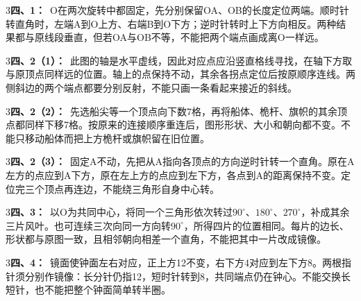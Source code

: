 \documentclass[multi=snippet,border={5bp 20bp 5bp 5bp}]{standalone}
\newenvironment{snippet}[3]{\begin{minipage}{#1bp}\color{answerred}\fontsize{#2}{#3}\selectfont\raggedright}{\end{minipage}}
\begin{document}
\begin{snippet}{505}{11.5}{14}\begin{multicols}{3}\raggedcolumns \textbf{四、1：}\ O在两次旋转中都固定，先分别保留OA、OB的长度定位两端。顺时针转直角时，左端A到O上方、右端B到O下方；逆时针转时上下方向相反。两种结果都与原线段垂直，但若OA与OB不等，不能把两个端点画成离O一样远。\end{multicols}\end{snippet}
\begin{snippet}{505}{11.5}{14}\begin{multicols}{3}\raggedcolumns \textbf{四、2（1）：}\ 此图的轴是水平虚线，因此对应点应沿竖直格线寻找，在轴下方取与原顶点同样远的位置。轴上的点保持不动，其余各拐点定位后按原顺序连线。两侧斜边的两个端点都要分别反射，不能只画一条看起来接近的斜线。\end{multicols}\end{snippet}
\begin{snippet}{505}{11.5}{14}\begin{multicols}{3}\raggedcolumns \textbf{四、2（2）：}\ 先选船尖等一个顶点向下数7格，再将船体、桅杆、旗帜的其余顶点都同样下移7格。按原来的连接顺序重连后，图形形状、大小和朝向都不变。不能只移动船体而把上方桅杆或旗帜留在旧位置。\end{multicols}\end{snippet}
\begin{snippet}{505}{11.5}{14}\begin{multicols}{3}\raggedcolumns \textbf{四、2（3）：}\ 固定A不动，先把从A指向各顶点的方向逆时针转一个直角。原在A左方的点应到A下方，原在左上方的点应到左下方，各点到A的距离保持不变。定位完三个顶点再连边，不能绕三角形自身中心转。\end{multicols}\end{snippet}
\begin{snippet}{505}{11.5}{14}\begin{multicols}{3}\raggedcolumns \textbf{四、3：}\ 以O为共同中心，将同一个三角形依次转过\(90^\circ\)\allowbreak 、\(180^\circ\)\allowbreak 、\(270^\circ\)\allowbreak ，补成其余三片风叶。也可连续三次向同一方向转\(90^\circ\)\allowbreak ，所得四片的位置相同。每片的边长、形状都与原图一致，且相邻朝向相差一个直角，不能把其中一片改成镜像。\end{multicols}\end{snippet}
\begin{snippet}{505}{11.5}{14}\begin{multicols}{3}\raggedcolumns \textbf{四、4：}\ 镜面使钟面左右对应，正上方12不变，右下方4对应到左下方8。两根指针须分别作镜像：长分针仍指12，短时针转到8，共同端点仍在钟心。不能交换长短针，也不能把整个钟面简单转半圈。\end{multicols}\end{snippet}
\end{document}
